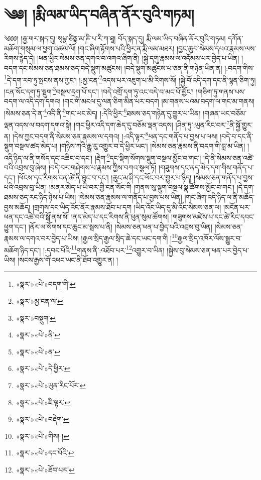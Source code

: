 \chapter{༄༅། །རྨི་ལམ་ཡིད་བཞིན་ནོར་བུའི་གཏམ།}༄༅༅། །རྒྱ་གར་སྐད་དུ། སྭཔྣ་ཙིནྟ་མ་ཎི་པ་རི་ཀ་ཐཱ། བོད་སྐད་དུ། རྨི་ལམ་ཡིད་བཞིན་ནོར་བུའི་གཏམ། དཀོན་མཆོག་གསུམ་ལ་ཕྱག་འཚལ་ལོ། །གང་ཞིག་རྟོགས་པའི་ཕྱིར་ན་རྨི་ལམ་མཐར། །བྱང་ཆུབ་སེམས་དཔའ་རྣམས་ལས་རིགས་རྙེད་དེ། །ཕན་ཕྱིར་སེམས་ཅན་དགའ་བ་འགའ་ཞིག་ནི། །སྐྱེ་དགུ་རྣམས་ལ་འདོམས་པར་བྱེད་པ་ཡིན། །བདག་དང་སེམས་ཅན་ཐམས་ཅད་བདེ་སྡུག་མཚུངས། །བདེ་སྡུག་མཚུངས་པ་ཅན་ནི་གཉེན་ཡིན་ན། །:བདག་གིས་\footnote{«སྣར་»«པེ་»བདག་གི་}དེ་དག་རབ་ཏུ་སྤངས་ནས་ཀྱང་། །:མྱ་ངན་\footnote{«སྣར་»མྱ་ངན་ལ་}འདས་པར་འཇུག་པ་མི་རིགས་སོ། །སྐྱེ་བོ་འདི་དག་དང་ནི་ལྷན་ཅིག་ཏུ། །ངན་སོང་དག་ཏུ་སྡུག་\footnote{«སྣར་»བསྡུག་}བསྔལ་དྲག་པོ་དང་། །བདེ་འགྲོ་དག་ཏུ་འང་བདེ་བ་མང་པོ་མྱོང་། །གཅིག་ཏུ་གནས་པས་བདག་ལ་འདི་དག་དགའ། །གང་གི་མངལ་དུ་ལན་ཅིག་མིན་པར་བདག །མ་གནས་པའམ་བདག་ལ་གང་མ་གནས། །སེམས་ཅན་དེ་ན་\footnote{«སྣར་»«པེ་»ནི་}འདི་ནི་\footnote{«སྣར་»«པེ་»ན་}གང་ཡང་མེད། །:དེའི་ཕྱིར་\footnote{«སྣར་»«པེ་»དེ་ཕྱིར་}ཐམས་ཅད་གཉེན་དུ་གྱུར་པ་ཡིན། །གཞན་ཡང་བཅོམ་ལྡན་འདས་ལ་བདག་དགའ་སྟེ། །གང་ཕྱིར་འདི་དག་ཆེད་དུ་བཅོམ་ལྡན་འདས། །ཤིན་ཏུ་:ཡུན་རིང་བར་\footnote{«སྣར་»«པེ་»ཡུན་རིང་པོར་}ནི་སྐྱོ་གྱུར་ན། །དེས་ཀྱང་བདག་ནི་སེམས་ཅན་རྣམས་ལ་དགའ། །:འདི་ལྟར་\footnote{«སྣར་»«པེ་»ཇི་ལྟར་}ཕན་དང་གནོད་པ་བྱས་པ་ལས། །བདེ་བ་དང་ནི་སྡུག་བསྔལ་ཚད་མེད་པ། །གཉིས་ཀའི་རྒྱུ་རུ་འགྱུར་བ་དེ་ཕྱིར་ཡང་། །སེམས་ཅན་རྣམས་ནི་བདག་གི་བླ་མ་ཡིན། །འདི་ཉིད་ལ་ནི་གསོད་དང་འཆིང་བ་དང་། །རྡེག་\footnote{«སྣར་»«པེ་»བརྡེག་}དང་སྡིག་སོགས་སྡུག་བསྔལ་མྱོང་བ་གང་། །དེ་ནི་སེམས་ཅན་འཚེ་བའི་འབྲས་བུ་ཞེས། །བདེ་བར་གཤེགས་པ་རྣམས་ཀྱིས་བཀའ་སྩལ་ཏོ། །གཟུགས་དང་ནད་མེད་དག་གིས་གནོད་པ་དང་། །ཕོངས་དང་རིགས་ངན་ཚེ་ནི་ཐུང་བ་དང་། །ཆུང་མ་ཤི་དང་ལོང་བར་གྱུར་པ་ཉིད། །སེམས་ཅན་གནོད་པ་བྱས་པའི་འབྲས་བུ་ཡིན། །མནར་མེད་པ་ཡི་བར་གྱི་ངན་སོང་གི །གནས་སུ་སྡུག་བསྔལ་སྣ་ཚོགས་མྱོང་བ་གང་། །དེ་དག་ཐམས་ཅད་རང་ཉིད་ཉེས་པ་ཡིས། །སེམས་ཅན་རྣམས་ལ་གནོད་པ་བྱས་པས་ཡིན། །གང་ཞིག་འདི་ཉིད་ལ་ནི་མཆོད་བྱས་མཆོད། །གྲགས་དང་ཡིད་འོང་ནོར་རྣམས་ཐོབ་པ་དག །ཡིད་འོང་ཡིད་དུ་མི་འོང་སེམས་ཅན་ལ། །མངོན་པར་ཕན་དང་འཚེ་བའི་སྒོ་ནས་སོ། །ནད་མེད་པ་དང་རིགས་ནི་ཕུན་སུམ་ཚོགས། །གཟུགས་མཛེས་པ་དང་ཚེ་རིང་དབང་ཕྱུག་དང་། །ནོར་ལ་སོགས་དང་ཆུང་མ་སྦས་པ་ནི། །སེམས་ཅན་ཕན་པ་བྱེད་པའི་འབྲས་བུ་ཡིན། །སེམས་ཅན་རྣམས་ལ་དགའ་བར་བྱེད་པ་ཡིས། །རྒྱལ་སྲིད་རྒྱལ་སྲིད་ཆེ་དང་ཡང་དག་གི །\footnote{«སྣར་»«པེ་»གིས། །}རྒྱལ་སྲིད་འཁོར་ལོས་སྒྱུར་བ་མཆོག་ཉིད་དང་། །:དབང་པོའི་\footnote{«སྣར་»«པེ་»དང་པོའི་}གནས་ནི་:འཐོབ་པར་\footnote{«སྣར་»«པེ་»ཐོབ་པར་}འགྱུར་བ་ཡིན། །སྐྱེས་བུ་སེམས་ཅན་ཕན་པར་བྱེད་པ་ཡིས། །སངས་རྒྱས་གོ་འཕང་ཡང་ནི་ཐོབ་འགྱུར་ན། །
